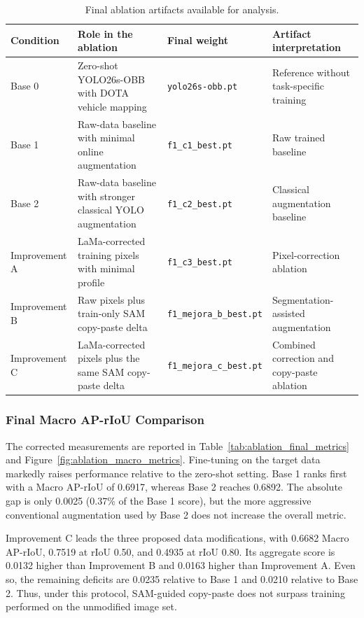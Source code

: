 \begin{table}[!t]
  \caption{Final ablation artifacts available for analysis.}
  \label{tab:ablation_artifact_status}
  \centering
  \small
  \begin{tabular}{p{} p{} p{} p{}}
    \toprule
    \textbf{Condition} & \textbf{Role in the ablation} & \textbf{Final weight} & \textbf{Artifact interpretation} \\
    \midrule
    Base 0 & Zero-shot YOLO26s-OBB with DOTA vehicle mapping & \texttt{yolo26s-obb.pt} & Reference without task-specific training \\
    Base 1 & Raw-data baseline with minimal online augmentation & \texttt{f1\_c1\_best.pt} & Raw trained baseline \\
    Base 2 & Raw-data baseline with stronger classical YOLO augmentation & \texttt{f1\_c2\_best.pt} & Classical augmentation baseline \\
    Improvement A & LaMa-corrected training pixels with minimal profile & \texttt{f1\_c3\_best.pt} & Pixel-correction ablation \\
    Improvement B & Raw pixels plus train-only SAM copy-paste delta & \texttt{f1\_mejora\_b\_best.pt} & Segmentation-assisted augmentation \\
    Improvement C & LaMa-corrected pixels plus the same SAM copy-paste delta & \texttt{f1\_mejora\_c\_best.pt} & Combined correction and copy-paste ablation \\
    \bottomrule
  \end{tabular}
\end{table}

\subsubsection{Final Macro AP-rIoU Comparison}
\label{sec:final_macro_ap_results}

The corrected measurements are reported in Table~\ref{tab:ablation_final_metrics} and Figure~\ref{fig:ablation_macro_metrics}. Fine-tuning on the target data markedly raises performance relative to the zero-shot setting. Base 1 ranks first with a Macro AP-rIoU of 0.6917, whereas Base 2 reaches 0.6892. The absolute gap is only 0.0025 (0.37\% of the Base 1 score), but the more aggressive conventional augmentation used by Base 2 does not increase the overall metric.

Improvement C leads the three proposed data modifications, with 0.6682 Macro AP-rIoU, 0.7519 at rIoU 0.50, and 0.4935 at rIoU 0.80. Its aggregate score is 0.0132 higher than Improvement B and 0.0163 higher than Improvement A. Even so, the remaining deficits are 0.0235 relative to Base 1 and 0.0210 relative to Base 2. Thus, under this protocol, SAM-guided copy-paste does not surpass training performed on the unmodified image set.

